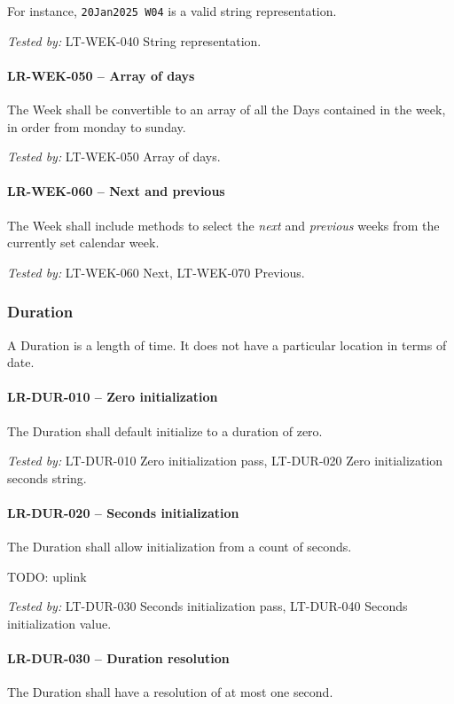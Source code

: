 For instance, \lstinline{20Jan2025 W04} is a valid string representation.

\textit{Tested by: } LT-WEK-040 String representation.

\paragraph{LR-WEK-050 -- Array of days}
The Week shall be convertible to an array of all the Days contained
in the week, in order from monday to sunday.

\textit{Tested by: } LT-WEK-050 Array of days.

\paragraph{LR-WEK-060 -- Next and previous}
The Week shall include methods to select the \emph{next} and \emph{previous}
weeks from the currently set calendar week.

\textit{Tested by: } LT-WEK-060 Next, LT-WEK-070 Previous.

\subsubsection{Duration}
A Duration is a length of time. It does not have a particular location
in terms of date.

\paragraph{LR-DUR-010 -- Zero initialization}
The Duration shall default initialize to a duration of zero.

\textit{Tested by: } LT-DUR-010 Zero initialization pass,
LT-DUR-020 Zero initialization seconds string.

\paragraph{LR-DUR-020 -- Seconds initialization}
The Duration shall allow initialization from a count of seconds.

TODO: uplink

\textit{Tested by: } LT-DUR-030 Seconds initialization pass,
LT-DUR-040 Seconds initialization value.

\paragraph{LR-DUR-030 -- Duration resolution}
The Duration shall have a resolution of at most one second.

